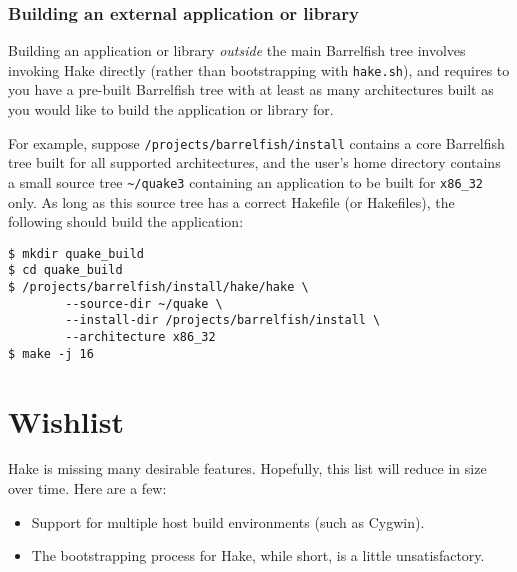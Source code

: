 \documentclass[a4paper,twoside]{report} %
\begin{document}
\subsection{Building an external application or library}

Building an application or library \emph{outside} the main Barrelfish
tree involves invoking Hake directly (rather than bootstrapping with
\texttt{hake.sh}), and requires to you have a pre-built Barrelfish
tree with at least as many architectures built as you would like to
build the application or library for.

For example, suppose \texttt{/projects/barrelfish/install} contains a
core Barrelfish tree built for all supported architectures, and the
user's home directory contains a small source tree
\verb!~/quake3! containing an application to be built for
\texttt{x86\_32} only.  As long as this source tree has a correct
Hakefile (or Hakefiles), the following should build the application:

\begin{verbatim}
$ mkdir quake_build
$ cd quake_build
$ /projects/barrelfish/install/hake/hake \
        --source-dir ~/quake \
        --install-dir /projects/barrelfish/install \
        --architecture x86_32
$ make -j 16
\end{verbatim}

\chapter{Wishlist}

Hake is missing many desirable features.  Hopefully, this list will
reduce in size over time.  Here are a few:

\begin{itemize}
\item Support for multiple host build environments (such as Cygwin). 
\item The bootstrapping process for Hake, while short, is a little
  unsatisfactory. 
\end{itemize}
\end{document}
